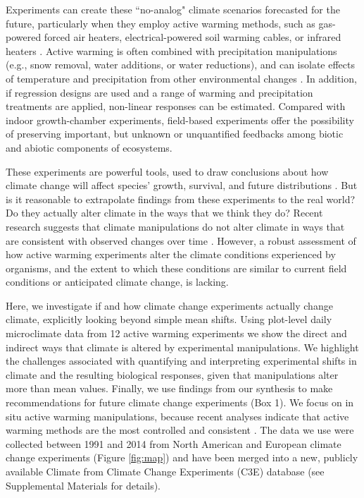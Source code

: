 \documentclass{article}
\begin{document}
\par Experiments can create these ``no-analog" climate scenarios forecasted for the future, particularly when they employ active warming methods, such as gas-powered forced air heaters, electrical-powered soil warming cables, or infrared heaters \citep{shaver2000,williams2007b,aronson2009}. Active warming is often combined with precipitation manipulations (e.g., snow removal, water additions, or water reductions), and can isolate effects of temperature and precipitation from other environmental changes \citep [e.g.,][]{price1998,cleland2006,sherry2007,rollinson2012}. In addition, if regression designs are used \citep[e.g.,][]{pelini2011} and a range of warming and precipitation treatments are applied, non-linear responses can be estimated. Compared with indoor growth-chamber experiments, field-based experiments offer the possibility of preserving important, but unknown or unquantified feedbacks among biotic and abiotic components of ecosystems. 
\par These experiments are powerful tools, used to draw conclusions about how climate change will affect species' growth, survival, and future distributions \citep{dukes1999,hobbie1999,reich2015,gruner2016}. But is it reasonable to extrapolate findings from these experiments to the real world? Do they actually alter climate in the ways that we think they do? Recent research suggests that climate manipulations do not alter climate in ways that are consistent with observed changes over time \citep{wolkovich2012}. However, a robust assessment of how active warming experiments alter the climate conditions experienced by organisms, and the extent to which these conditions are similar to current field conditions or anticipated climate change, is lacking. 
\par Here, we investigate if and how climate change experiments actually change climate, explicitly looking beyond simple mean shifts. Using plot-level daily microclimate data from 12 active warming experiments we show the direct and indirect ways that climate is altered by experimental manipulations. We highlight the challenges associated with quantifying and interpreting experimental shifts in climate and the resulting biological responses, given that manipulations alter more than mean values. Finally, we use findings from our synthesis to make recommendations for future climate change experiments (Box 1). We focus on in situ active warming manipulations, because recent analyses indicate that active warming methods are the most controlled and consistent \citep{kimball2005,kimball2008,aronson2009,wolkovich2012}. The data we use were collected between 1991 and 2014 from North American and European climate change experiments (Figure \ref{fig:map}) and have been merged into a new, publicly available Climate from Climate Change Experiments (C3E) database (see Supplemental Materials for details). 
\end{document}

